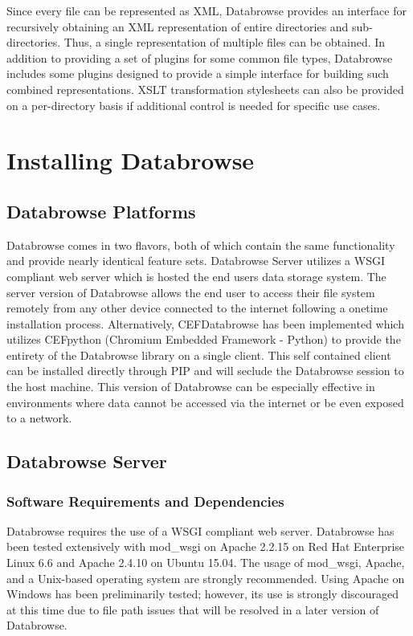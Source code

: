 \documentclass[10pt]{article}
\begin{document}
Since every file can be represented as XML, Databrowse provides an interface for recursively obtaining an XML representation of entire directories and sub-directories.  Thus, a single representation of multiple files can be obtained.  In addition to providing a set of plugins for some common file types, Databrowse includes some plugins designed to provide a simple interface for building such combined representations.  XSLT transformation stylesheets can also be provided on a per-directory basis if additional control is needed for specific use cases.

\clearpage
\section{Installing Databrowse}

\subsection{Databrowse Platforms}

Databrowse comes in two flavors, both of which contain the same functionality and provide nearly identical feature sets. Databrowse Server utilizes a WSGI compliant web server which is hosted the end users data storage system. The server version of Databrowse allows the end user to access their file system remotely from any other device connected to the internet following a onetime installation process. Alternatively, CEFDatabrowse has been implemented which utilizes CEFpython (Chromium Embedded Framework - Python) to provide the entirety of the Databrowse library on a single client. This self contained client can be installed directly through PIP and will seclude the Databrowse session to the host machine. This version of Databrowse can be especially effective in environments where data cannot be accessed via the internet or be even exposed to a network.

\subsection{Databrowse Server}
\subsubsection{Software Requirements and Dependencies}

Databrowse requires the use of a WSGI compliant web server.  Databrowse has been tested extensively with mod\_wsgi on Apache 2.2.15 on Red Hat Enterprise Linux 6.6 and Apache 2.4.10 on Ubuntu 15.04.  The usage of mod\_wsgi, Apache, and a Unix-based operating system are strongly recommended.  Using Apache on Windows has been preliminarily tested; however, its use is strongly discouraged at this time due to file path issues that will be resolved in a later version of Databrowse.
\end{document}
